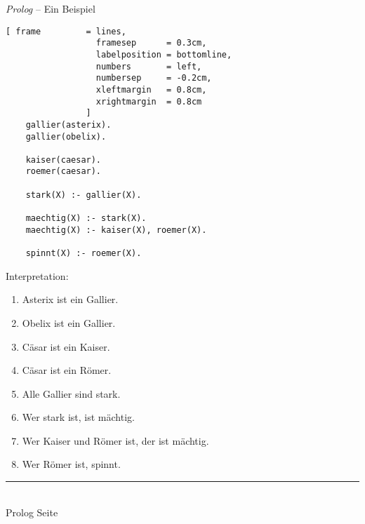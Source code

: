 \documentclass{slides}
\newcommand{\myrule}{\rule{20cm}{1mm}\\ }
\newcounter{mypage}
\begin{document}
\begin{slide}{}
\normalsize
\begin{center}
\textsl{Prolog} -- Ein Beispiel 
\end{center}
\vspace{0.5cm}

\footnotesize
\begin{Verbatim}[ frame         = lines, 
                  framesep      = 0.3cm, 
                  labelposition = bottomline,
                  numbers       = left,
                  numbersep     = -0.2cm,
                  xleftmargin   = 0.8cm,
                  xrightmargin  = 0.8cm
                ]
    gallier(asterix).
    gallier(obelix).

    kaiser(caesar).
    roemer(caesar).

    stark(X) :- gallier(X).

    maechtig(X) :- stark(X).
    maechtig(X) :- kaiser(X), roemer(X).

    spinnt(X) :- roemer(X).
\end{Verbatim}

Interpretation:
\begin{enumerate}
\item Asterix ist ein Gallier.
\item Obelix ist ein Gallier.
\item C\"{a}sar ist ein Kaiser.
\item C\"{a}sar ist ein R\"{o}mer.
\item Alle Gallier sind stark.
\item Wer stark ist, ist m\"{a}chtig.
\item Wer Kaiser und R\"{o}mer ist, der ist m\"{a}chtig.
\item Wer R\"{o}mer ist, spinnt. 
\end{enumerate}



\vspace*{\fill}
\tiny \addtocounter{mypage}{1}
\myrule
Prolog  \hspace*{\fill} Seite 
\end{slide}


\end{document}
